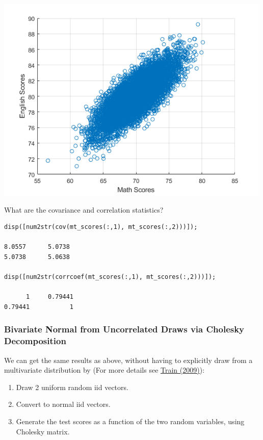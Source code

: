 \documentclass[
]{book}
\begin{document}
\includegraphics[width=5.20833in,height=\textheight]{img/fs_cholesky_decomposition_images/figure_0.png}

What are the covariance and correlation statistics?

\begin{verbatim}
disp([num2str(cov(mt_scores(:,1), mt_scores(:,2)))]);

8.0557      5.0738
5.0738      5.0638

disp([num2str(corrcoef(mt_scores(:,1), mt_scores(:,2)))]);

      1     0.79441
0.79441           1
\end{verbatim}

\hypertarget{bivariate-normal-from-uncorrelated-draws-via-cholesky-decomposition}{%
\subsubsection{Bivariate Normal from Uncorrelated Draws via Cholesky Decomposition}\label{bivariate-normal-from-uncorrelated-draws-via-cholesky-decomposition}}

We can get the same results as above, without having to explicitly draw
from a multivariate distribution by (For more details see \href{https://eml.berkeley.edu/~train/distant.html}{Train
(2009)}):

\begin{enumerate}
\def\labelenumi{\arabic{enumi}.}
\item
  Draw 2 uniform random iid vectors.
\item
  Convert to normal iid vectors.
\item
  Generate the test scores as a function of the two random variables,
  using Cholesky matrix.
\end{enumerate}
\end{document}
